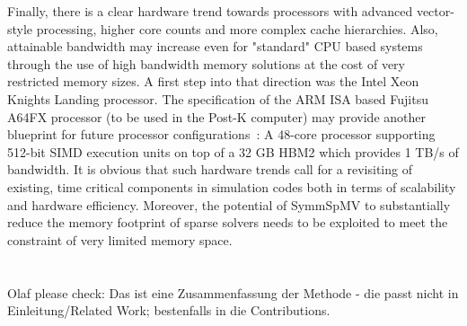 Finally, there is a clear hardware trend towards processors with advanced vector-style processing, higher core counts and more complex cache hierarchies. Also, attainable bandwidth may increase even for "standard" CPU based systems through the use of high bandwidth memory solutions at the cost of very restricted memory sizes. A first step into that direction was the Intel Xeon Knights Landing processor. The specification of the ARM ISA based Fujitsu A64FX processor (to be used in the Post-K computer) may provide another blueprint for future processor configurations~\cite{Post-K:Processor}: A 48-core processor supporting 512-bit SIMD execution units on top of a 32 GB HBM2 which provides 1 TB/s of bandwidth.  It is obvious that such hardware trends call for a revisiting of existing, time critical components in simulation codes both in terms of scalability and hardware efficiency. Moreover, the potential of \acrshort{SymmSpMV} to substantially reduce the memory footprint of sparse solvers needs to be exploited to meet the constraint of very limited memory space. 
\\
\
\\
\\
{\GW Olaf please check: Das ist eine Zusammenfassung der Methode - die passt nicht in Einleitung/Related Work; bestenfalls in die Contributions.}
